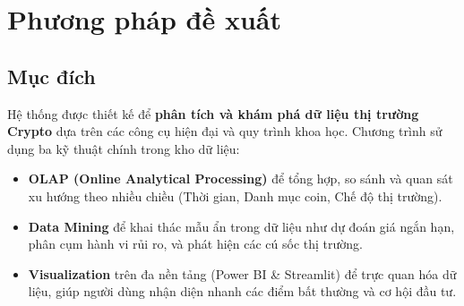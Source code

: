 \section{Phương pháp đề xuất}

\subsection{Mục đích}
\hspace*{0.8cm}
Hệ thống được thiết kế để \textbf{phân tích và khám phá dữ liệu thị trường Crypto} dựa trên các công cụ hiện đại và quy trình khoa học.  
Chương trình sử dụng ba kỹ thuật chính trong kho dữ liệu:
\begin{itemize}
    \item \textbf{OLAP (Online Analytical Processing)} để tổng hợp, so sánh và quan sát xu hướng theo nhiều chiều (Thời gian, Danh mục coin, Chế độ thị trường).
    \item \textbf{Data Mining} để khai thác mẫu ẩn trong dữ liệu như dự đoán giá ngắn hạn, phân cụm hành vi rủi ro, và phát hiện các cú sốc thị trường.
    \item \textbf{Visualization} trên đa nền tảng (Power BI \& Streamlit) để trực quan hóa dữ liệu, giúp người dùng nhận diện nhanh các điểm bất thường và cơ hội đầu tư.
\end{itemize}

